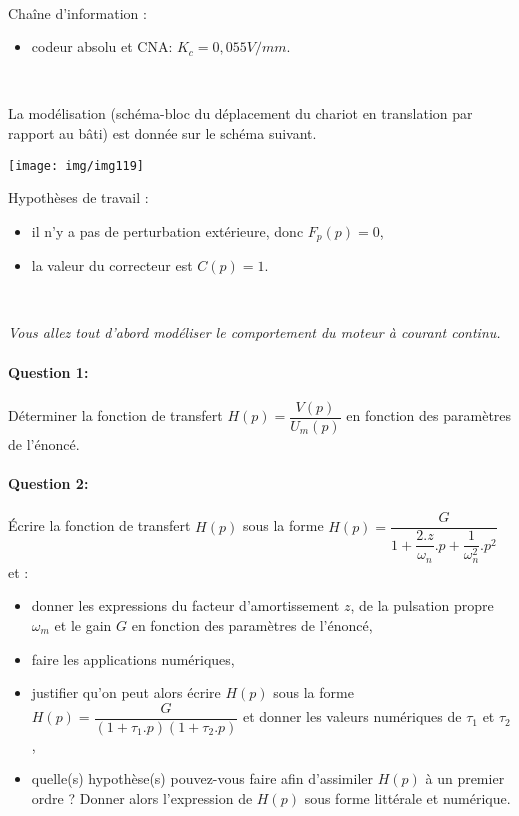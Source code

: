 ~\

Chaîne d'information :
\begin{itemize}
 \item codeur absolu et CNA: $K_c=0,055V/mm$.
\end{itemize}

~\

La modélisation (schéma-bloc du déplacement du chariot en translation par rapport au bâti) est donnée sur le schéma suivant. 

\begin{center}
 \texttt{[image: img/img119]}
\end{center}

\newpage 

Hypothèses de travail :
\begin{itemize}
 \item il n'y a pas de perturbation extérieure, donc $F_p(p)=0$,
 \item la valeur du correcteur est $C(p)=1$.
\end{itemize}

~\

\textit{Vous allez tout d'abord modéliser le comportement du moteur à courant continu.}

\paragraph{Question 1:} Déterminer la fonction de transfert $H(p)=\dfrac{V(p)}{U_m(p)}$ en fonction des paramètres de l'énoncé.

\paragraph{Question 2:} Écrire la fonction de transfert $H(p)$ sous la forme $H(p)=\dfrac{G}{1+\dfrac{2.z}{\omega_n}.p+\dfrac{1}{\omega_n^2}.p^2}$ et :
 \begin{itemize}
  \item donner les expressions du facteur d'amortissement $z$, de la pulsation propre $\omega_m$ et le gain $G$ en fonction des paramètres de l'énoncé,
  \item faire les applications numériques,
  \item justifier qu'on peut alors écrire $H(p)$ sous la forme $H(p)=\dfrac{G}{(1+\tau_1.p)(1+\tau_2.p)}$  et donner les valeurs numériques de $\tau_1$ et $\tau_2$,
  \item	quelle(s) hypothèse(s) pouvez-vous faire afin d'assimiler $H(p)$ à un premier ordre ? Donner alors l'expression de $H(p)$ sous forme littérale et numérique.
 \end{itemize}

